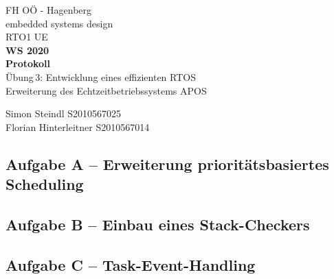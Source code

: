 \documentclass{article}
\begin{document}
\begin{titlepage}
	\begin{center}
		{\large{FH OÖ - Hagenberg \\ embedded systems design}\\\vspace*{4cm}}
		\small{RTO1 UE}\\
		\textbf{WS 2020}\\\vspace*{2cm}
		\Huge{\textbf{Protokoll}}\\\vspace*{1cm}
		\huge{Übung\,3: Entwicklung eines effizienten RTOS  \\ \large{ Erweiterung des Echtzeitbetriebssystems APOS} } \vspace*{90mm}
		
		\small{Simon Steindl  S2010567025	\\
		Florian Hinterleitner S2010567014	\\
		}
	\end{center}
\end{titlepage}

 

\subsection*{Aufgabe A – Erweiterung prioritätsbasiertes Scheduling}
\subsection*{Aufgabe B – Einbau eines Stack-Checkers}
\subsection*{Aufgabe C – Task-Event-Handling}
\end{document}
